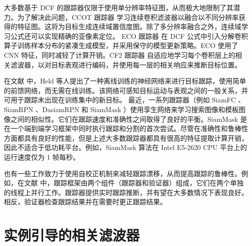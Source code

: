 大多数基于 DCF 的跟踪器仅限于使用单分辨率特征图，从而极大地限制了其潜力。为了解决此问题，CCOT 跟踪器 \cite{danelljan2016beyond} 学习连续卷积滤波器以融合以不同分辨率获得的特征图。这将为目标生成连续域置信度图。除了多分辨率融合之外，连续域学习公式还可以实现精确的亚像素定位。
ECO 跟踪器 \cite{danelljan2017eco} 在 DCF 公式中引入分解卷积算子训练样本分布的紧凑生成模型，并采用保守的模型更新策略。ECO 使用了 CNN 特征，同时减轻了计算开销。CF2 跟踪器 \cite{CF2} 自适应地学习每个卷积层上的相关滤波器，以对目标表观进行编码，并使用每一层的相关响应来推断目标位置。

在文献 \cite{GOTURN} 中，Held 等人提出了一种离线训练的神经网络来进行目标跟踪，使用简单的前馈网络，而无需在线训练。该网络可感知目标运动与表观之间的一般关系，并可用于跟踪未出现在训练集中的新目标。
最近，一系列跟踪器（例如 SiamFC \cite{SiamFC}、SiamRPN \cite{SiamRPN}、DasiamRPN \cite{zhu2018distractor} 和 SiamMask \cite{Wang2018SiamMask}）使用孪生网络来学习搜索图像和模板图像之间的相似性。它们在跟踪速度和准确性之间取得了良好的平衡。SiamMask 是在一个端到端学习框架中同时执行跟踪和分割的首次尝试。尽管在准确性和鲁棒性方面都具有良好的性能，但是上述大多数跟踪器都具有很高的特征提取计算开销，因此不适合于低功耗平台。例如，SiamMask 算法在 Intel E5-2620 CPU 平台上的运行速度仅为 1 帧每秒。

也有一些工作致力于使用自校正机制来减轻跟踪漂移，从而提高跟踪的鲁棒性。例如，在文献 \cite{fan2018parallel} 中，跟踪框架由两个组件（跟踪器和验证器）组成，它们在两个单独的线程上并行工作。跟踪器提供实时跟踪推断，并有望在大多数情况下表现良好。相反，验证器检查跟踪结果并在需要时更正跟踪结果。

\section{实例引导的相关滤波器}

